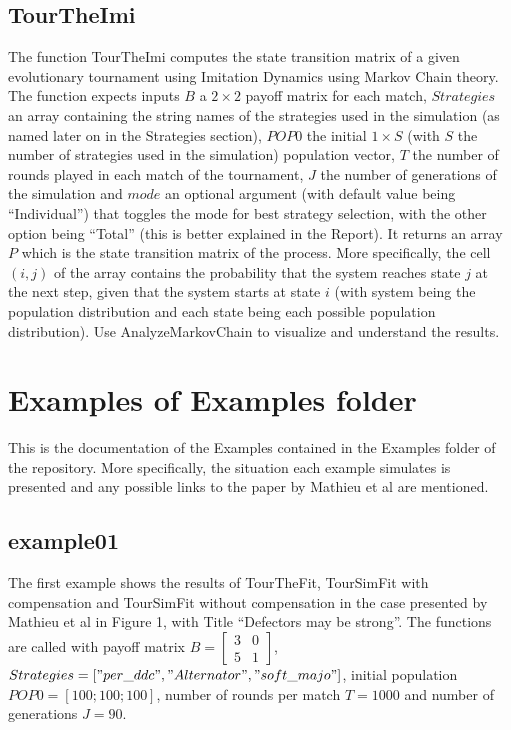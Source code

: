 \subsection{TourTheImi}
The function TourTheImi computes the state transition matrix of a given evolutionary tournament using Imitation Dynamics using Markov Chain theory. The function expects inputs $B$ a $2 \times 2$ payoff matrix for each match, $Strategies$ an array containing the string names of the strategies used in the simulation (as named later on in the Strategies section), $POP0$ the initial $1 \times S$ (with $S$ the number of strategies used in the simulation) population vector, $T$ the number of rounds played in each match of the tournament, $J$ the number of generations of the simulation and $mode$ an optional argument (with default value being ``Individual'') that toggles the mode for best strategy selection, with the other option being ``Total'' (this is better explained in the Report). It returns an array $P$ which is the state transition matrix of the process. More specifically, the cell $(i,j)$ of the array contains the probability that the system reaches state $j$ at the next step, given that the system starts at state $i$ (with system being the population distribution and each state being each possible population distribution). Use AnalyzeMarkovChain to visualize and understand the results.

\section{Examples of Examples folder}
This is the documentation of the Examples contained in the Examples folder of the repository. More specifically, the situation each example simulates is presented and any possible links to the paper by Mathieu et al are mentioned.

\subsection{example01}
The first example shows the results of TourTheFit, TourSimFit with compensation and TourSimFit without compensation in the case presented by Mathieu et al in Figure 1, with Title ``Defectors may be strong''. The functions are called with payoff matrix $B = \begin{bmatrix} 3 & 0 \\ 5 & 1 \end{bmatrix}$, $Strategies = ["per\_ddc", "Alternator", "soft\_majo"]$, initial population $POP0 = [100; 100; 100]$, number of rounds per match $T = 1000$ and number of generations $J = 90$.

